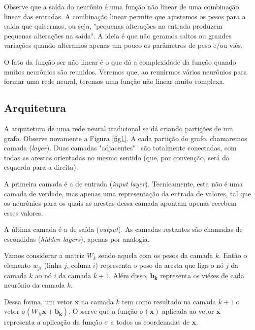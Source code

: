 \documentclass{article}
\begin{document}
            Observe que a saída do neurônio é uma função não linear de uma combinação linear das entradas.
            A combinação linear permite que ajustemos os pesos para a saída que quisermos, ou seja, "pequenas alterações na entrada produzem pequenas alterações na saída".
            A ideia é que não geramos saltos ou grandes variações quando alteramos apenas um pouco os parâmetros de peso e/ou viés.
            
            O fato da função ser não linear é o que dá a complexidade da função quando muitos neurônios são reunidos.
            Veremos que, ao reunirmos vários neurônios para formar uma rede neural, teremos uma função não linear muito complexa.

        \subsection{Arquitetura}

            A arquitetura de uma rede neural tradicional se dá criando partições de um grafo.
            Observe novamente a Figura \ref{fig1}.
            A cada partição do grafo, chamaremos camada (\textit{layer}).
            Duas camadas "adjacentes" \ são totalmente conectadas, com todas as arestas orientadas no mesmo sentido (que, por convenção, será da esquerda para a direita).

            A primeira camada é a de entrada (\textit{input layer}).
            Tecnicamente, esta não é uma camada de verdade, mas apenas uma representação da entrada de valores, tal que os neurônios para os quais as arestas dessa camada apontam apenas recebem esses valores.
            
            A última camada é a de saída (\textit{output}).
            As camadas restantes são chamadas de escondidas (\textit{hidden layers}), apenas por analogia.

            Vamos considerar a matriz $W_k$ sendo aquela com os pesos da camada $k$.
            Então o elemento $w_{ji}$ (linha $j$, coluna $i$) representa o peso da aresta que liga o nó $j$ da camada $k$ ao nó $i$ da camada $k + 1$.
            Além disso, $\mathbf{b_k}$ representa os viéses de cada neurônio da camada $k$.
            
            Dessa forma, um vetor $\mathbf{x}$ na camada $k$ tem como resultado na camada $k + 1$ o vetor $\sigma (W_{ji} \mathbf{x} + \mathbf{b_k})$.
            Observe que a função $\sigma(\mathbf{x})$ aplicada ao vetor $\mathbf{x}$ representa a aplicação da função $\sigma$ a todos as coordenadas de $\mathbf{x}$.
\end{document}
